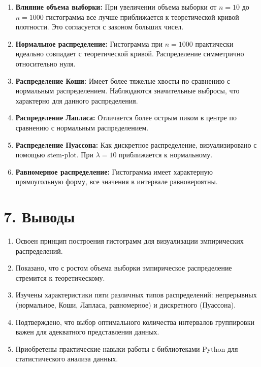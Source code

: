 \documentclass[a4paper,14pt]{extarticle}
\begin{document}
\begin{enumerate}
    \item \textbf{Влияние объема выборки:} При увеличении объема выборки от $n=10$ до $n=1000$ гистограмма все лучше приближается к теоретической кривой плотности. Это согласуется с законом больших чисел.
    
    \item \textbf{Нормальное распределение:} Гистограмма при $n=1000$ практически идеально совпадает с теоретической кривой. Распределение симметрично относительно нуля.
    
    \item \textbf{Распределение Коши:} Имеет более тяжелые хвосты по сравнению с нормальным распределением. Наблюдаются значительные выбросы, что характерно для данного распределения.
    
    \item \textbf{Распределение Лапласа:} Отличается более острым пиком в центре по сравнению с нормальным распределением.
    
    \item \textbf{Распределение Пуассона:} Как дискретное распределение, визуализировано с помощью stem-plot. При $\lambda=10$ приближается к нормальному.
    
    \item \textbf{Равномерное распределение:} Гистограмма имеет характерную прямоугольную форму, все значения в интервале равновероятны.
\end{enumerate}

\section*{7. Выводы}

\begin{enumerate}
    \item Освоен принцип построения гистограмм для визуализации эмпирических распределений.
    
    \item Показано, что с ростом объема выборки эмпирическое распределение стремится к теоретическому.
    
    \item Изучены характеристики пяти различных типов распределений: непрерывных (нормальное, Коши, Лапласа, равномерное) и дискретного (Пуассона).
    
    \item Подтверждено, что выбор оптимального количества интервалов группировки важен для адекватного представления данных.
    
    \item Приобретены практические навыки работы с библиотеками Python для статистического анализа данных.
\end{enumerate}
\end{document}
